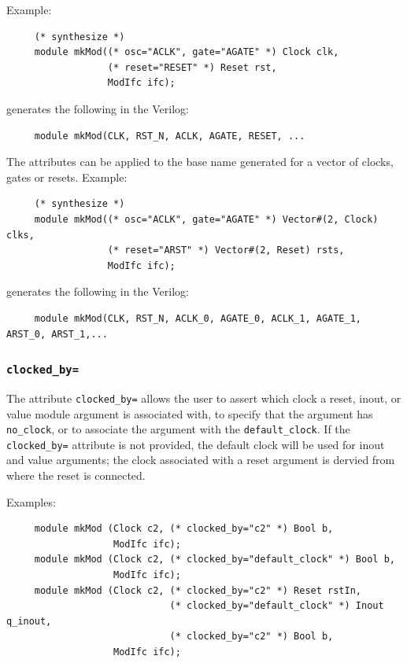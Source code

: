\documentclass[twoside,letterpaper]{article}
\newcommand{\te}[1]{\texttt{#1}}
\begin{document}
Example:
\begin{verbatim}
     (* synthesize *)
     module mkMod((* osc="ACLK", gate="AGATE" *) Clock clk, 
                  (* reset="RESET" *) Reset rst, 
                  ModIfc ifc);
\end{verbatim}
generates the following in the Verilog:
\begin{verbatim}
     module mkMod(CLK, RST_N, ACLK, AGATE, RESET, ...
\end{verbatim}

The attributes can be applied to the base name generated for a vector
of clocks, gates or resets.  Example:
\begin{verbatim}
     (* synthesize *)
     module mkMod((* osc="ACLK", gate="AGATE" *) Vector#(2, Clock) clks, 
                  (* reset="ARST" *) Vector#(2, Reset) rsts, 
                  ModIfc ifc);
\end{verbatim}
generates the following in the Verilog:
\begin{verbatim}
     module mkMod(CLK, RST_N, ACLK_0, AGATE_0, ACLK_1, AGATE_1, ARST_0, ARST_1,...
\end{verbatim}


\subsubsection{\te{clocked\_by=}}
\index{clocked\_by=@\te{clocked\_by=}(attribute)}
\label{sec-clockedby}


The attribute \te{clocked\_by=} allows the user to assert which clock
a reset, inout, or value module argument  is associated
with, to specify  that the argument has
\te{no\_clock}, or to associate the argument with  the
 \te{default\_clock}.  
If the \te{clocked\_by=} attribute is not provided,
the default clock will be used for inout and value arguments; the
clock associated with a reset argument is dervied from where the
reset is connected.


Examples:
\begin{verbatim}
     module mkMod (Clock c2, (* clocked_by="c2" *) Bool b,
                   ModIfc ifc);
     module mkMod (Clock c2, (* clocked_by="default_clock" *) Bool b,
                   ModIfc ifc);
     module mkMod (Clock c2, (* clocked_by="c2" *) Reset rstIn,
                             (* clocked_by="default_clock" *) Inout q_inout,
                             (* clocked_by="c2" *) Bool b, 
                   ModIfc ifc);

\end{verbatim}
\end{document}
